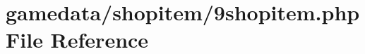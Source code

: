 \hypertarget{9shopitem_8php}{\section{gamedata/shopitem/9shopitem.php File Reference}
\label{9shopitem_8php}
}
